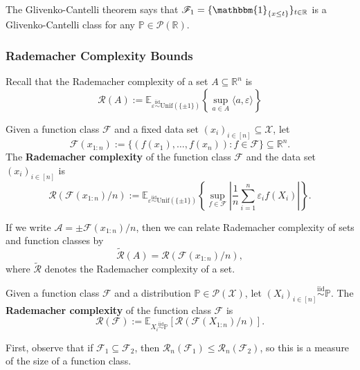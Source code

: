 \begin{exam}
The Glivenko-Cantelli theorem says that $\mathcal{F}_1 = \{\mathbbm{1}_{\{x \leq t\}}\}_{t \in \mathbb{R}}$ is a Glivenko-Cantelli class for any $\mathbb{P} \in \mathcal{P}(\mathbb{R})$.
\end{exam}

\subsubsection{Rademacher Complexity Bounds}
Recall that the Rademacher complexity of a set $A \subseteq \mathbb{R}^n$ is
\[
\mathcal{R}(A) := \mathbb{E}_{\varepsilon \overset{\text{iid}}{\sim} \text{Unif}(\{\pm 1\})} \left\{ \sup_{a \in A} \langle a, \varepsilon \rangle \right\}
\]

\begin{defn}
Given a function class $\mathcal{F}$ and a fixed data set $(x_i)_{i \in [n]} \subseteq \mathcal{X}$, let
\[
\mathcal{F}(x_{1:n}) := \{(f(x_1), \ldots, f(x_n)) : f \in \mathcal{F}\} \subseteq \mathbb{R}^n.
\]
The \textbf{Rademacher complexity} of the function class $\mathcal{F}$ and the data set $(x_i)_{i \in [n]}$ is
\[
\mathcal{R}(\mathcal{F}(x_{1:n})/n) := \mathbb{E}_{\varepsilon \overset{\text{iid}}{\sim} \text{Unif}(\{\pm 1\})} \left\{ \sup_{f \in \mathcal{F}} \left| \frac{1}{n} \sum_{i=1}^n \varepsilon_i f(X_i) \right| \right\}.
\]
\end{defn}

If we write $\mathcal{A} = \pm \mathcal{F}(x_{1:n})/n$, then we can relate Rademacher complexity of sets and function classes by
\[
\widetilde{\mathcal{R}}(A) = \mathcal{R}(\mathcal{F}(x_{1:n})/n),
\]
where $\widetilde{\mathcal{R}}$ denotes the Rademacher complexity of a set.

\begin{defn}
Given a function class $\mathcal{F}$ and a distribution $\mathbb{P} \in \mathcal{P}(\mathcal{X})$, let $(X_i)_{i \in [n]} \overset{\text{iid}}{\sim} \mathbb{P}$. The \textbf{Rademacher complexity} of the function class $\mathcal{F}$ is
\[
\mathcal{R}(\mathcal{F}) := \mathbb{E}_{X_i \overset{\text{iid}}{\sim} \mathbb{P}}[\mathcal{R}(\mathcal{F}(X_{1:n})/n)].
\]
\end{defn}

First, observe that if $\mathcal{F}_1 \subseteq \mathcal{F}_2$, then $\mathcal{R}_n(\mathcal{F}_1) \leq \mathcal{R}_n(\mathcal{F}_2)$, so this is a measure of the size of a function class.

